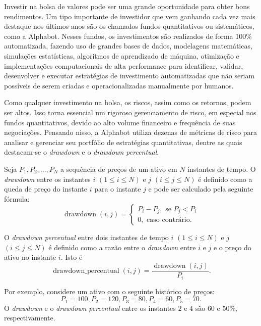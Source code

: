 Investir na bolsa de valores pode ser uma grande oportunidade para obter bons rendimentos. Um tipo importante de investidor que vem ganhando cada vez mais destaque nos últimos anos são os chamados fundos quantitativos ou sistemáticos, como a Alphabot. Nesses fundos,  os investimentos são realizados de forma 100\% automatizada, fazendo uso de grandes bases de dados, modelagens matemáticas, simulações estatísticas, algoritmos de aprendizado de máquina, otimização e implementações computacionais de alta performance para identificar, validar, desenvolver e executar estratégias de investimento automatizadas que não seriam possíveis de serem criadas e operacionalizadas manualmente por humanos.

Como qualquer investimento na bolsa, os riscos, assim como os retornos, podem ser altos. Isso torna essencial um rigoroso gerenciamento de risco, em especial nos fundos quantitativos, devido ao alto volume financeiro e frequência de suas negociações. Pensando nisso, a Alphabot utiliza dezenas de métricas de risco para analisar e gerenciar seu portfólio de estratégias quantitativas, dentre as quais destacam-se o \emph{drawdown} e o \emph{drawdown percentual}.

Seja $P_1, P_2, \ldots, P_N$ a sequência de preços de um ativo em $N$ instantes de tempo.
O \emph{drawdown} entre os instantes $i$ $(1 \leq i \leq N)$ e $j$ $(i \leq j \leq N)$ é definido como a queda de preço do instante $i$ para o instante $j$ e
pode ser calculado pela seguinte fórmula:
\begin{equation*}
    \operatorname{drawdown}\left(i, j\right) = \begin{cases}
        P_i - P_j, \text{ se } P_j < P_i \\
        0, \text{ caso contrário.}
    \end{cases}
\end{equation*}

O \emph{drawdown percentual} entre dois instantes de tempo $i$ $(1 \leq i \leq N)$ e $j$ $(i \leq j \leq N)$ é definido como a razão entre o \emph{drawdown} entre $i$ e $j$ e o preço do ativo no instante $i$. Isto é
\begin{equation*}
    \operatorname{drawdown\_percentual}\left(i, j\right) = \frac{\operatorname{drawdown}\left(i, j\right)}{P_i}. 
\end{equation*}

Por exemplo, considere um ativo com o seguinte histórico de preços:
\begin{equation*}
P_1 = 100, P_2 = 120, P_3 = 80, P_4 =  60, P_5 = 70.
\end{equation*}
O \emph{drawdown} e o \emph{drawdown percentual} entre os instantes $2$ e $4$ são $60$ e $50\%$, respectivamente.

